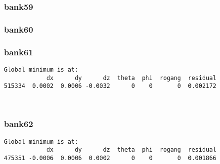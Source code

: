 \documentclass[11pt]{article}
\begin{document}
    \hypertarget{bank59}{%
\subsubsection{bank59}\label{bank59}}

    \hypertarget{bank60}{%
\subsubsection{bank60}\label{bank60}}

    \hypertarget{bank61}{%
\subsubsection{bank61}\label{bank61}}

    \begin{Verbatim}[commandchars=\\\{\}]
Global minimum is at:
            dx      dy      dz  theta  phi  rogang  residual
515334  0.0002  0.0006 -0.0032      0    0       0  0.002172
    \end{Verbatim}

    \begin{center}
    \end{center}
    { \hspace*{\fill} \\}
    
    \hypertarget{bank62}{%
\subsubsection{bank62}\label{bank62}}

    \begin{Verbatim}[commandchars=\\\{\}]
Global minimum is at:
            dx      dy      dz  theta  phi  rogang  residual
475351 -0.0006  0.0006  0.0002      0    0       0  0.001866
    \end{Verbatim}

    \begin{center}
    \end{center}
    { \hspace*{\fill} \\}
    
\end{document}
